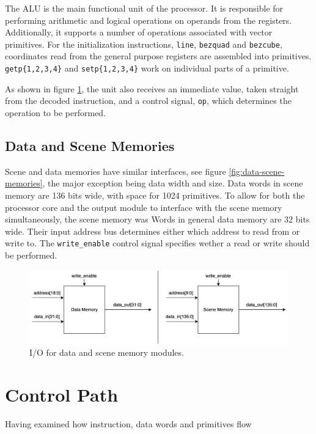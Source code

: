 The ALU is the main functional unit of the processor.
It is responsible for performing arithmetic and logical operations on operands from the registers.
Additionally, it supports a number of operations associated with vector primitives.
For the initialization instructions, \texttt{line}, \texttt{bezquad} and \texttt{bezcube}, coordinates read from the general purpose registers are assembled into primitives.
\texttt{getp\{1,2,3,4\}} and \texttt{setp\{1,2,3,4\}} work on individual parts of a primitive.

As shown in figure \ref{fig:ALU}, the unit also receives an immediate value, taken straight from the decoded instruction, and a control signal, \texttt{op}, which determines the operation to be performed.

\subsection{Data and Scene Memories}

Scene and data memories have similar interfaces, see figure \ref{fig:data-scene-memories}, the major exception being data width and size.
Data words in scene memory are 136 bits wide, with space for 1024 primitives.
To allow for both the processor core and the output module to interface with the scene memory simultaneously, the scene memory was 
Words in general data memory are 32 bits wide.
Their input address bus determines either which address to read from or write to.
The \texttt{write\_enable} control signal specifies wether a read or write should be performed.

\begin{figure}[h!]
    \includegraphics[width=0.8\linewidth]{images/data-scene-memories.png}
    \caption{I/O for data and scene memory modules.}
    \label{fig:ALU}
\end{figure}


\section{Control Path}

Having examined how instruction, data words and primitives flow 

